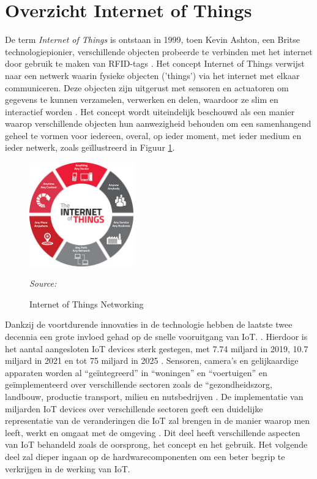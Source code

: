 \section{Overzicht Internet of Things}
De term \textit{Internet of Things} is ontstaan in 1999, toen Kevin Ashton, een Britse technologiepionier, verschillende objecten probeerde te verbinden met het internet door gebruik te maken van RFID-tags \autocite{Bassi2013, Rejeb2023}. Het concept Internet of Things verwijst naar een netwerk waarin fysieke objecten ('things') via het internet met elkaar communiceren. Deze objecten zijn uitgerust met sensoren en actuatoren om gegevens te kunnen verzamelen, verwerken en delen, waardoor ze slim en interactief worden \autocite{Elksasy2023}. Het concept wordt uiteindelijk beschouwd als een manier waarop verschillende objecten hun aanwezigheid behouden om een samenhangend geheel te vormen voor iedereen, overal, op ieder moment, met ieder medium en ieder netwerk, zoals geïllustreerd in Figuur \ref{fig:Figuur9}. 

\begin{figure}[h]
    \centering
    \includegraphics[width=0.4\textwidth]{img/bp/iot-concept.jpg}
    \caption{Internet of Things Networking}
    \label{fig:Figuur9}
    \textit{Source: \autocite{Dauwed2018}}
\end{figure}

Dankzij de voortdurende innovaties in de technologie hebben de laatste twee decennia een grote invloed gehad op de snelle vooruitgang van IoT. \autocite{Almutairi2024}. Hierdoor is het aantal aangesloten IoT devices sterk gestegen, met 7.74 miljard in 2019, 10.7 miljard in 2021 \autocite{Dawod2022} en tot 75 miljard in 2025 \autocite{Khan2019}. Sensoren, camera's en gelijkaardige apparaten worden al “geïntegreerd” in “woningen” en “voertuigen” \autocite{Dawod2022} en geïmplementeerd over verschillende sectoren zoals de “gezondheidszorg, landbouw, productie transport, milieu en nutsbedrijven \autocite{Naresh2020, Almutairi2024}. De implementatie van miljarden \autocite{Dawod2022} IoT devices over verschillende sectoren geeft een duidelijke representatie van de veranderingen die IoT zal brengen in de manier waarop men leeft, werkt en omgaat met de omgeving \autocite{Almutairi2024}. Dit deel heeft verschillende aspecten van IoT behandeld zoals de oorsprong, het concept en het gebruik. Het volgende deel zal dieper ingaan op de hardwarecomponenten om een beter begrip te verkrijgen in de werking van IoT.


